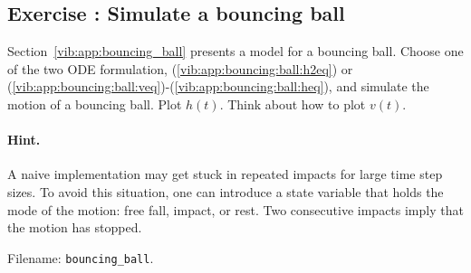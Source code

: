 \documentclass[%
oneside,                 %
final,                   %
10pt]{article}
\newenvironment{doconceexercise}{}{}
\newcounter{doconceexercisecounter}
\begin{document}
\begin{doconceexercise}

\subsection*{Exercise \thedoconceexercisecounter: Simulate a bouncing ball}

\label{vib:exer:bouncing:ball}

Section~\ref{vib:app:bouncing_ball} presents a model for a bouncing
ball.
Choose one of the two ODE formulation, (\ref{vib:app:bouncing:ball:h2eq}) or
(\ref{vib:app:bouncing:ball:veq})-(\ref{vib:app:bouncing:ball:heq}),
and simulate the motion of a bouncing ball. Plot $h(t)$. Think about how to
plot $v(t)$.


\paragraph{Hint.}
A naive implementation may get stuck in repeated impacts for large time
step sizes. To avoid this situation, one can introduce a state
variable that holds the mode of the motion: free fall, impact, or rest.
Two consecutive impacts imply that the motion has stopped.



\noindent Filename: \Verb!bouncing_ball!.

\end{doconceexercise}
\end{document}
